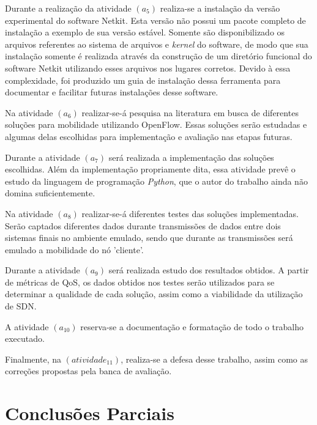 \documentclass[	12pt, Times, openright, twoside, a4paper, english, brazil]{abntex2}
\begin{document}
Durante a realização da atividade $(a_5)$ realiza-se a instalação da versão experimental do software Netkit. Esta versão não possui um pacote completo de instalação a exemplo de sua versão estável. Somente são disponibilizado os arquivos referentes ao sistema de arquivos e \textit{kernel} do software, de modo que sua instalação somente é realizada através da construção de um diretório funcional do software Netkit utilizando esses arquivos nos lugares corretos. Devido à essa complexidade, foi produzido um guia de instalação dessa ferramenta para documentar e facilitar futuras instalações desse software.

Na atividade $(a_6)$ realizar-se-á pesquisa na literatura em busca de diferentes soluções para mobilidade utilizando OpenFlow. Essas soluções serão estudadas e algumas delas escolhidas para implementação e avaliação nas etapas futuras.

Durante a atividade $(a_7)$ será realizada a implementação das soluções escolhidas. Além da implementação propriamente dita, essa atividade prevê o estudo da linguagem de programação \textit{Python}, que o autor do trabalho ainda não domina suficientemente.

Na atividade $(a_8)$ realizar-se-á diferentes testes das soluções implementadas. Serão captados diferentes dados durante transmissões de dados entre dois sistemas finais no ambiente emulado, sendo que durante as transmissões será emulado a mobilidade do nó 'cliente'.

Durante a atividade $(a_9)$ será realizada estudo dos resultados obtidos. A partir de métricas de QoS, os dados obtidos nos testes serão utilizados para se determinar a qualidade de cada solução, assim como a viabilidade da utilização de SDN.

A atividade $(a_{10})$ reserva-se a documentação e formatação de todo o trabalho executado.

Finalmente, na $(atividade_{11})$, realiza-se a defesa desse trabalho, assim como as correções propostas pela banca de avaliação.

\chapter{Conclusões Parciais}
\label{cap:conclusoes}

\end{document}
